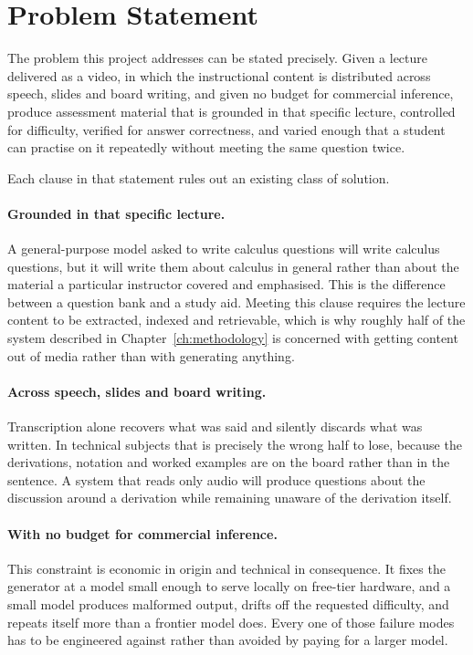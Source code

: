 \section{Problem Statement}
\label{sec:intro-problem}

The problem this project addresses can be stated precisely. Given a lecture
delivered as a video, in which the instructional content is distributed across
speech, slides and board writing, and given no budget for commercial inference,
produce assessment material that is grounded in that specific lecture,
controlled for difficulty, verified for answer correctness, and varied enough
that a student can practise on it repeatedly without meeting the same question
twice.

Each clause in that statement rules out an existing class of solution.

\paragraph{Grounded in that specific lecture.} A general-purpose model asked to
write calculus questions will write calculus questions, but it will write them
about calculus in general rather than about the material a particular instructor
covered and emphasised. This is the difference between a question bank and a
study aid. Meeting this clause requires the lecture content to be extracted,
indexed and retrievable, which is why roughly half of the system described in
Chapter~\ref{ch:methodology} is concerned with getting content out of media
rather than with generating anything.

\paragraph{Across speech, slides and board writing.} Transcription alone
recovers what was said and silently discards what was written. In technical
subjects that is precisely the wrong half to lose, because the derivations,
notation and worked examples are on the board rather than in the sentence. A
system that reads only audio will produce questions about the discussion around
a derivation while remaining unaware of the derivation itself.

\paragraph{With no budget for commercial inference.} This constraint is
economic in origin and technical in consequence. It fixes the generator at a
model small enough to serve locally on free-tier hardware, and a small model
produces malformed output, drifts off the requested difficulty, and repeats
itself more than a frontier model does. Every one of those failure modes has to
be engineered against rather than avoided by paying for a larger model.

